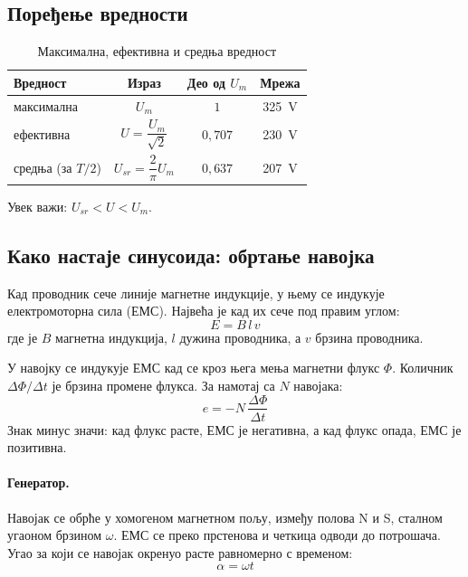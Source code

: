 \documentclass{article}
\begin{document}
\subsection{Поређење вредности}

\begin{table}[H]
    \centering
    \renewcommand{\arraystretch}{1.9}
    \begin{tabular}{lccc}
        \toprule
        Вредност & Израз & Део од $U_m$ & Мрежа \\
        \midrule
        максимална   & $U_m$                         & $1$         & 325~V \\
        ефективна    & $U = \dfrac{U_m}{\sqrt{2}}$   & $0{,}707$   & 230~V \\
        средња (за $T/2$) & $U_{sr} = \dfrac{2}{\pi}U_m$ & $0{,}637$ & 207~V \\
        \bottomrule
    \end{tabular}
    \caption{Максимална, ефективна и средња вредност}
    \label{tab:poredjenje}
\end{table}

Увек важи: $U_{sr} < U < U_m$.


\subsection{Како настаје синусоида: обртање навојка}

Кад проводник сече линије магнетне индукције, у њему се индукује електромоторна сила (ЕМС). Највећа је кад их сече под правим углом:
\begin{equation}
    E = B\,l\,v
\end{equation}
где је $B$ магнетна индукција, $l$ дужина проводника, а $v$ брзина проводника.

У навојку се индукује ЕМС кад се кроз њега мења магнетни флукс $\Phi$. Количник $\Delta\Phi/\Delta t$ је брзина промене флукса. За намотај са $N$ навојака:
\begin{equation}
    e = -N\,\frac{\Delta\Phi}{\Delta t}
\end{equation}
Знак минус значи: кад флукс расте, ЕМС је негативна, а кад флукс опада, ЕМС је позитивна.

\paragraph{Генератор.} Навојак се обрће у хомогеном магнетном пољу, између полова N и S, сталном угаоном брзином $\omega$. ЕМС се преко прстенова и четкица одводи до потрошача. Угао за који се навојак окренуо расте равномерно с временом:
\begin{equation}
    \alpha = \omega t
\end{equation}
\end{document}
